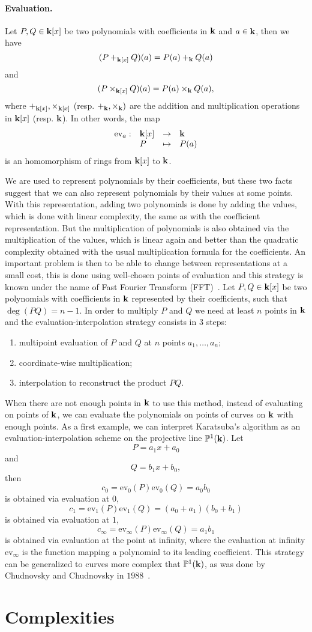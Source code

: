 \paragraph{Evaluation.} Let $P, Q\in\mathbf{k}[x]$ be two polynomials with coefficients
in $\mathbf{k}$ and $a\in\mathbf{k}$, then we have
\[
  (P+_{\mathbf{k}[x]}Q)(a) = P(a) +_{\mathbf{k}} Q(a)
\]
and 
\[
  (P\times_{\mathbf{k}[x]} Q)(a) = P(a) \times_{\mathbf{k}} Q(a),
\]
where $+_{\mathbf{k}[x]}, \times_{\mathbf{k}[x]}$ (resp. $+_{\mathbf{k}}, \times_{\mathbf{k}})$ are the addition
and multiplication operations in $\mathbf{k}[x]$ (resp. $\mathbf{k}$).
In other words, the map
\[
\begin{array}{llll}
  \textrm{ev}_a:&\mathbf{k}[x]&\to&\mathbf{k}\\
  &P&\mapsto&P(a)
\end{array}
\]
is an homomorphism of rings from $\mathbf{k}[x]$ to $\mathbf{k}$.

We are used to represent polynomials by their coefficients, but these two facts
suggest that we can also represent polynomials by their values at some points.
With this representation, adding two polynomials is done by adding the
values, which is done with linear complexity, the same as with the coefficient
representation. But the multiplication of polynomials is also obtained via the
multiplication of the values, which is linear again and better than the
quadratic complexity obtained with the usual multiplication formula for the
coefficients. An important problem is then to be able to change between
representations at a small cost, this is done using well-chosen points of
evaluation and this strategy is known under the name of Fast Fourier
Transform (FFT)~\cite{GG13}. Let $P, Q\in\mathbf{k}[x]$ be two polynomials with
coefficients in $\mathbf{k}$ represented by their coefficients, such that
$\deg(PQ)=n-1$. In order to multiply $P$ and $Q$ we need at least $n$ points in
$\mathbf{k}$ and the evaluation-interpolation strategy consists in $3$ steps:
\begin{enumerate}
  \item multipoint evaluation of $P$ and $Q$ at $n$ points $a_1, \dots, a_n$;
  \item coordinate-wise multiplication;
  \item interpolation to reconstruct the product $PQ$.
\end{enumerate}
When there are not enough points in $\mathbf{k}$ to use this method, instead of
evaluating on points of $\mathbf{k}$, we can evaluate the polynomials on points of
curves on $\mathbf{k}$ with enough points. As a first example, we can interpret
Karatsuba's algorithm as an evaluation-interpolation scheme on
the projective line $\mathbb{P}^1(\mathbf{k})$. Let 
\[
  P = a_1 x + a_0
\]
and 
\[
  Q = b_1 x + b_0,
\]
then
\[
  c_0 = \textrm{ev}_0(P)\textrm{ev}_0(Q) = a_0b_0
\]
is obtained via evaluation at $0$,
\[
  c_1 = \textrm{ev}_1(P)\textrm{ev}_1(Q) = (a_0+a_1)(b_0+b_1)
\]
is obtained via evaluation at $1$,
\[
  c_\infty = \textrm{ev}_\infty(P)\textrm{ev}_\infty(Q) = a_1b_1
\]
is obtained via evaluation at the point at infinity, where the evaluation at
infinity $\textrm{ev}_{\infty}$ is the function mapping a polynomial to its
leading coefficient. This strategy can be generalized to curves more complex
that $\mathbb{P}^1(\mathbf{k})$, as was done by Chudnovsky and Chudnovsky in
$1988$~\cite{CC88}.


\section{Complexities}
